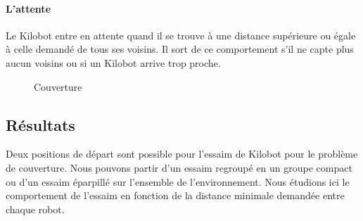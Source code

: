 \documentclass[a4paper]{article}
\begin{document}
\paragraph{L'attente} Le Kilobot entre en attente quand il se trouve à une distance supérieure ou égale à celle demandé de tous ses voisins. Il sort de ce comportement s'il ne capte plus aucun voisins ou si un Kilobot arrive trop proche.\\


\begin{figure}[h!]
\centering
{}
\caption{Couverture}
\end{figure}
\newpage
\subsection{Résultats}
Deux positions de départ sont possible pour l'essaim de Kilobot pour le problème de couverture. Nous pouvons partir d'un essaim regroupé en un groupe compact ou d'un essaim éparpillé sur l'ensemble de l'environnement.
Nous étudions ici le comportement de l'essaim en fonction de la distance minimale demandée entre chaque robot.
\end{document}

